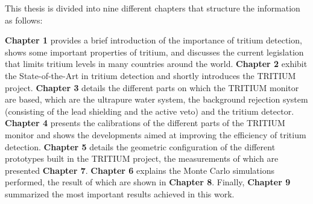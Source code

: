 This thesis is divided into nine different chapters that structure the information as follows:

\textbf{Chapter 1} provides a brief introduction of the importance of tritium detection, shows some important properties of tritium, and discusses the current legislation that limits tritium levels in many countries around the world. \textbf{Chapter 2} exhibit the State-of-the-Art in tritium detection and shortly introduces the TRITIUM project. \textbf{Chapter 3} details the different parts on which the TRITIUM monitor are based, which are the ultrapure water system, the background rejection system (consisting of the lead shielding and the active veto)  and the tritium detector. \textbf{Chapter 4} presents the calibrations of the different parts of the TRITIUM monitor and shows the developments aimed at improving the efficiency of tritium detection. \textbf{Chapter 5} details the geometric configuration of the different prototypes built in the TRITIUM project, the measurements of which are presented \textbf{Chapter 7}. \textbf{Chapter 6} explains the Monte Carlo simulations performed, the result of which are shown in \textbf{Chapter 8}. Finally, \textbf{Chapter 9} summarized the most important results achieved in this work.